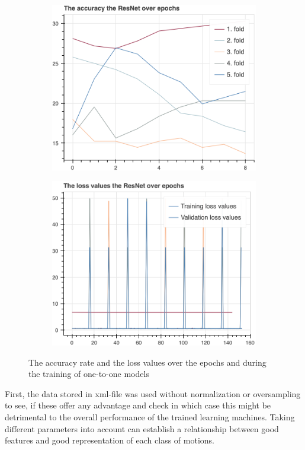 \begin{figure}[H]
\begin{subfigure}[b]{0.49\textwidth}
				\centering
				\includegraphics[width=\textwidth]{img/ResNet_accuracy.png}
			\end{subfigure}
			\hfill
			\begin{subfigure}[b]{0.49\textwidth}
				\centering
				\includegraphics[width=\textwidth]{img/ResNet_loss_values.png}
			\end{subfigure}
			\caption{The accuracy rate and the loss values over the epochs and during the training of one-to-one models}
			\label{fig:accuray_loss_one2one_models}
		\end{figure}
		First, the data stored in xml-file was used without normalization or oversampling to see, if these offer any advantage and check in which case this might be detrimental to the overall performance of the trained learning machines. Taking different parameters into account can establish a relationship between good features and good representation of each class of motions.\newline
